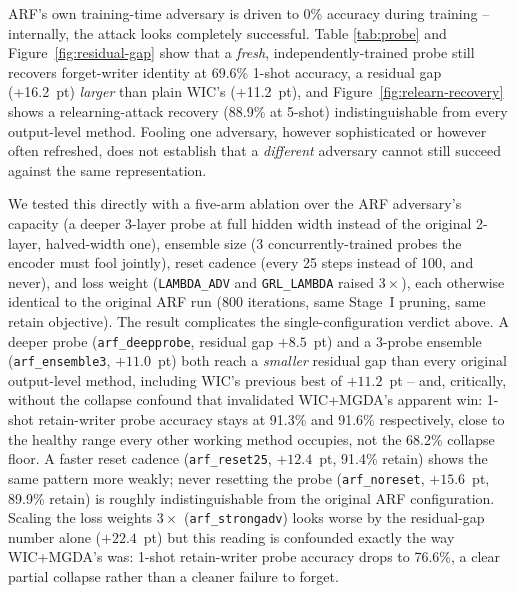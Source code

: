 \documentclass[a4paper,fleqn]{cas-dc}
\begin{document}
ARF's own training-time adversary is driven to 0\% accuracy during
training -- internally, the attack looks completely successful. Table
\ref{tab:probe} and Figure~\ref{fig:residual-gap} show that a
\emph{fresh}, independently-trained probe still recovers forget-writer
identity at 69.6\% 1-shot accuracy, a residual gap (+16.2~pt) \emph{larger}
than plain WIC's (+11.2~pt), and Figure~\ref{fig:relearn-recovery} shows a
relearning-attack recovery (88.9\% at 5-shot) indistinguishable from every
output-level method. Fooling one adversary, however sophisticated or
however often refreshed, does not establish that a \emph{different}
adversary cannot still succeed against the same representation.

We tested this directly with a five-arm ablation over the ARF adversary's
capacity (a deeper 3-layer probe at full hidden width instead of the
original 2-layer, halved-width one), ensemble size (3 concurrently-trained
probes the encoder must fool jointly), reset cadence (every 25 steps
instead of 100, and never), and loss weight (\texttt{LAMBDA\_ADV} and
\texttt{GRL\_LAMBDA} raised $3\times$), each otherwise identical to the
original ARF run (800 iterations, same Stage~I pruning, same retain
objective). The result complicates the single-configuration verdict above.
A deeper probe (\texttt{arf\_deepprobe}, residual gap $+8.5$~pt) and a
3-probe ensemble (\texttt{arf\_ensemble3}, $+11.0$~pt) both reach a
\emph{smaller} residual gap than every original output-level method,
including WIC's previous best of $+11.2$~pt -- and, critically, without the
collapse confound that invalidated WIC+MGDA's apparent win: 1-shot
retain-writer probe accuracy stays at 91.3\% and 91.6\% respectively,
close to the healthy range every other working method occupies, not the
68.2\% collapse floor. A faster reset cadence
(\texttt{arf\_reset25}, $+12.4$~pt, 91.4\% retain) shows the same pattern
more weakly; never resetting the probe (\texttt{arf\_noreset}, $+15.6$~pt,
89.9\% retain) is roughly indistinguishable from the original ARF
configuration. Scaling the loss weights $3\times$
(\texttt{arf\_strongadv}) looks worse by the residual-gap number alone
($+22.4$~pt) but this reading is confounded exactly the way WIC+MGDA's was:
1-shot retain-writer probe accuracy drops to 76.6\%, a clear partial
collapse rather than a cleaner failure to forget.
\end{document}
